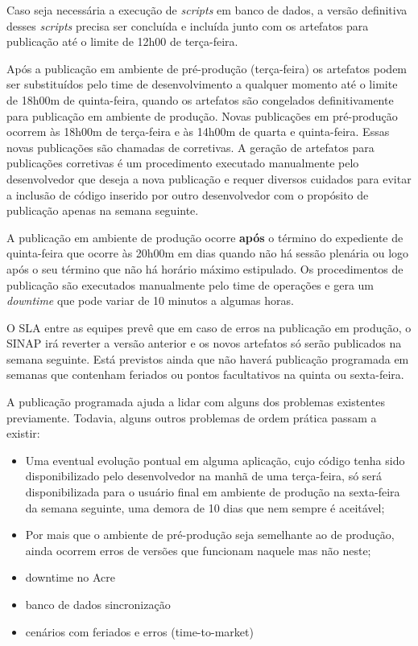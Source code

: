 Caso seja necessária a execução de \textit{scripts} em banco de dados, a versão
definitiva desses \textit{scripts} precisa ser concluída e incluída junto com
os artefatos para publicação até o limite de 12h00 de terça-feira.

Após a publicação em ambiente de pré-produção (terça-feira) os artefatos podem
ser substituídos pelo time de desenvolvimento a qualquer momento até o limite
de 18h00m de quinta-feira, quando os artefatos são congelados definitivamente
para publicação em ambiente de produção. Novas publicações em pré-produção
ocorrem às 18h00m de terça-feira e às 14h00m de quarta e quinta-feira. Essas
novas publicações são chamadas de corretivas. A geração de artefatos para
publicações corretivas é um procedimento executado manualmente pelo
desenvolvedor que deseja a nova publicação e requer diversos cuidados para
evitar a inclusão de código inserido por outro desenvolvedor com o propósito
de publicação apenas na semana seguinte.

A publicação em ambiente de produção ocorre \textbf{após} o término do
expediente de quinta-feira que ocorre às 20h00m em dias quando não há sessão
plenária ou logo após o seu término que não há horário máximo estipulado.
Os procedimentos de publicação são executados manualmente pelo time de
operações e gera um \textit{downtime} que pode variar de 10 minutos a algumas
horas.

O \acrshort{SLA} entre as equipes prevê que em caso de erros na publicação em
produção, o \acrshort{SINAP} irá reverter a versão anterior e os novos
artefatos só serão publicados na semana seguinte. Está previstos ainda que
não haverá publicação programada em semanas que contenham feriados ou pontos
facultativos na quinta ou sexta-feira.

A publicação programada ajuda a lidar com alguns dos problemas existentes
previamente. Todavia, alguns outros problemas de ordem prática passam a existir:

\begin{itemize}
\item Uma eventual evolução pontual em alguma aplicação, cujo código tenha sido
disponibilizado pelo desenvolvedor na manhã de uma terça-feira, só será
disponibilizada para o usuário final em ambiente de produção na sexta-feira da
semana seguinte, uma demora de 10 dias que nem sempre é aceitável;

\item Por mais que o ambiente de pré-produção seja semelhante ao de produção,
ainda ocorrem erros de versões que funcionam naquele mas não neste;

\item downtime no Acre

\item banco de dados sincronização

\item cenários com feriados e erros (time-to-market)

\end{itemize}

